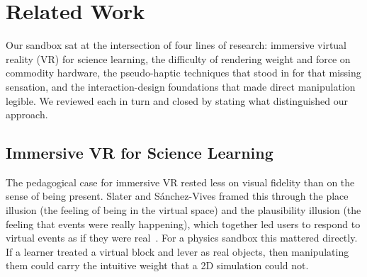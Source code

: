 
\section{Related Work}
Our sandbox sat at the intersection of four lines of research: immersive virtual
reality (VR) for science learning, the difficulty of rendering weight and force on
commodity hardware, the pseudo-haptic techniques that stood in for that missing
sensation, and the interaction-design foundations that made direct manipulation
legible. We reviewed each in turn and closed by stating what distinguished our
approach.

\subsection{Immersive VR for Science Learning}
The pedagogical case for immersive VR rested less on visual fidelity than on the
sense of being present. Slater and S{\'a}nchez-Vives framed this through the place
illusion (the feeling of being in the virtual space) and the plausibility
illusion (the feeling that events were really happening), which together led
users to respond to virtual events as if they were real~\cite{slater2016enhancing}.
For a physics sandbox this mattered directly. If a learner treated a virtual block
and lever as real objects, then manipulating them could carry the intuitive weight
that a 2D simulation could not.

